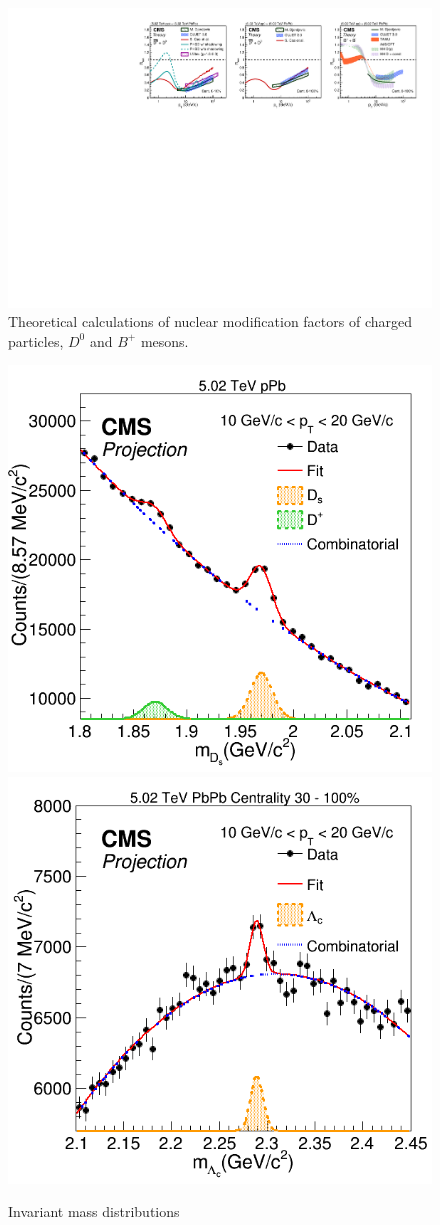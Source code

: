 \begin{figure}[!ht]
\begin{center}
\includegraphics[width=.90\textwidth]{figures/cTheoryRAA_BD_v1.pdf}
\caption{Theoretical calculations of nuclear modification factors of charged particles, $D^0$ and $B^+$ mesons.}
\label{fig:RAA_theory}
\end{center}
\end{figure}

\begin{figure}[!ht]
\begin{center}
\includegraphics[width=.45\textwidth]{InvMassFigures/Ds.png}
\includegraphics[width=.45\textwidth]{InvMassFigures/LambdaC.png}
\caption{Invariant mass distributions}
\label{fig:HFmMsonMass}
\end{center}
\end{figure}


